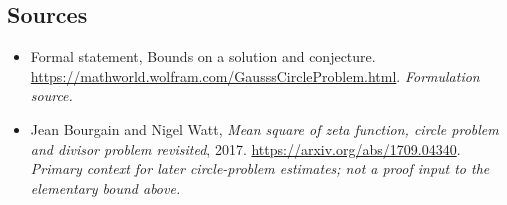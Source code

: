 \documentclass[11pt]{article}
\begin{document}
\subsection{Sources}
\begin{itemize}
\item[S1]Formal statement, Bounds on a solution and conjecture.
\url{https://mathworld.wolfram.com/GausssCircleProblem.html}.
\textit{Formulation source.}
\item[E1]Jean Bourgain and Nigel Watt, \emph{Mean square of zeta function, circle problem and divisor problem revisited}, 2017.
\url{https://arxiv.org/abs/1709.04340}.
\textit{Primary context for later circle-problem estimates; not a proof input to the elementary bound above.}
\end{itemize}
\end{document}
